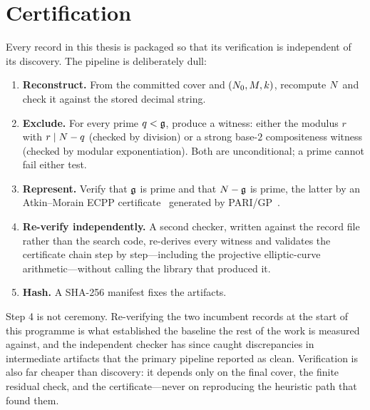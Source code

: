 \section{Certification}\label{sec:certification}

Every record in this thesis is packaged so that its verification is independent
of its discovery. The pipeline is deliberately dull:

\begin{enumerate}
\item \textbf{Reconstruct.} From the committed cover and $(N_0,M,k)$,
recompute $N$ and check it against the stored decimal string.
\item \textbf{Exclude.} For every prime $q<\mathfrak{g}$, produce a witness: either the
modulus $r$ with $r\mid N-q$ (checked by division) or a strong base-$2$
compositeness witness (checked by modular exponentiation). Both are
unconditional; a prime cannot fail either test.
\item \textbf{Represent.} Verify that $\mathfrak{g}$ is prime and that $N-\mathfrak{g}$ is prime,
the latter by an Atkin--Morain ECPP certificate~\cite{GoldwasserKilian,AtkinMorain}
generated by PARI/GP~\cite{PARI}.
\item \textbf{Re-verify independently.} A second checker, written against the
record file rather than the search code, re-derives every witness and validates
the certificate chain step by step---including the projective
elliptic-curve arithmetic---without calling the library that produced it.
\item \textbf{Hash.} A SHA-256 manifest fixes the artifacts.
\end{enumerate}

Step 4 is not ceremony. Re-verifying the two incumbent records at the start of
this programme is what established the baseline the rest of the work is measured
against, and the independent checker has since caught discrepancies in
intermediate artifacts that the primary pipeline reported as clean. Verification
is also far cheaper than discovery: it depends only on the final cover, the
finite residual check, and the certificate---never on reproducing the heuristic
path that found them.
